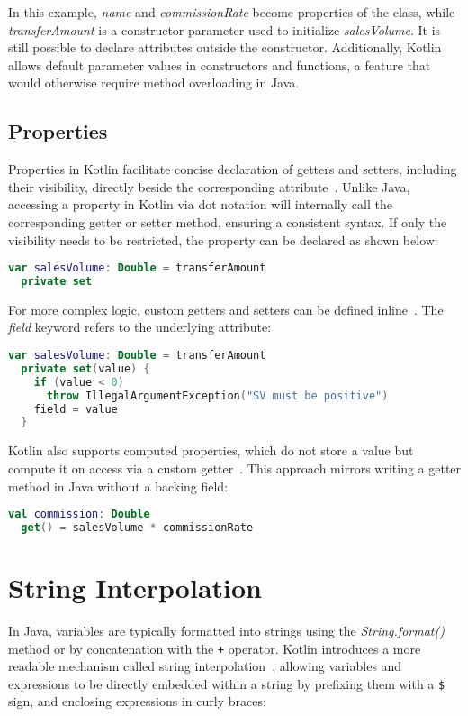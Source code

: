 \documentclass[a4paper,11pt]{article}
\begin{document}
In this example, \textit{name} and \textit{commissionRate} become properties of the class, while \textit{transferAmount} is a constructor parameter used to initialize \textit{salesVolume}. It is still possible to declare attributes outside the constructor. Additionally, Kotlin allows default parameter values in constructors and functions, a feature that would otherwise require method overloading in Java.

\subsection{Properties}
Properties in Kotlin facilitate concise declaration of getters and setters, including their visibility, directly beside the corresponding attribute~\cite{declaring-properties,properties-getters-setters}. Unlike Java, accessing a property in Kotlin via dot notation will internally call the corresponding getter or setter method, ensuring a consistent syntax.
If only the visibility needs to be restricted, the property can be declared as shown below:

\begin{lstlisting}[language=Kotlin, title={Private setter}]
var salesVolume: Double = transferAmount
  private set
\end{lstlisting}

For more complex logic, custom getters and setters can be defined inline~\cite{properties-getters-setters}. The \textit{field} keyword refers to the underlying attribute:

\begin{lstlisting}[language=Kotlin, title={Custom accessors}]
var salesVolume: Double = transferAmount
  private set(value) {
    if (value < 0)
      throw IllegalArgumentException("SV must be positive")
    field = value
  }
\end{lstlisting}

Kotlin also supports computed properties, which do not store a value but compute it on access via a custom getter~\cite{properties-getters-setters}. This approach mirrors writing a getter method in Java without a backing field:

\begin{lstlisting}[language=Kotlin, title={Computed Property}]
val commission: Double
  get() = salesVolume * commissionRate
\end{lstlisting}

\section{String Interpolation}
In Java, variables are typically formatted into strings using the \textit{String.format()} method or by concatenation with the \texttt{+} operator. Kotlin introduces a more readable mechanism called string interpolation~\cite{string-concatenation}, allowing variables and expressions to be directly embedded within a string by prefixing them with a \texttt{\$} sign, and enclosing expressions in curly braces:
\end{document}
